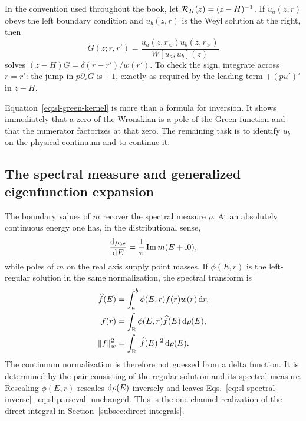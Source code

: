 In the convention used throughout the book, let
$\mathcal{R}_H(z)=(z-H)^{-1}$.  If $u_a(z,r)$ obeys the left
boundary condition and $u_b(z,r)$ is the Weyl solution at the right, then
\begin{equation}
  G(z;r,r')
  =\frac{u_a(z,r_<)u_b(z,r_>)}
  {W[u_a,u_b](z)}
  \label{eq:sl-green-kernel}
\end{equation}
solves $(z-H)G=\delta(r-r')/w(r')$.  To check the sign, integrate across
$r=r'$: the jump in $p\partial_rG$ is $+1$, exactly as required by the
leading term $+(pu')'$ in $z-H$.

Equation~\eqref{eq:sl-green-kernel} is more than a formula for inversion.  It
shows immediately that a zero of the Wronskian is a pole of the Green
function and that the numerator factorizes at that zero.  The remaining task
is to identify $u_b$ on the physical continuum and to continue it.

\subsection{The spectral measure and generalized eigenfunction expansion}
\label{subsec:sl-eigenfunction-expansion}

The boundary values of $m$ recover the spectral measure $\rho$.  At an
absolutely continuous energy one has, in the distributional sense,
\begin{equation}
  \frac{\mathrm{d}\rho_{\mathrm{ac}}}{\mathrm{d} E}
  =\frac{1}{\pi}\operatorname{Im} m(E+\mathrm{i}0),
  \label{eq:m-spectral-density}
\end{equation}
while poles of $m$ on the real axis supply point masses.  If $\phi(E,r)$ is
the left-regular solution in the same normalization, the spectral transform
is
\begin{align}
  \widehat f(E)
  &=\int_a^b\phi(E,r)f(r)w(r)\,\mathrm{d} r,
  \label{eq:sl-spectral-transform}\\
  f(r)
  &=\int_{\mathbb{R}}\phi(E,r)\widehat f(E)\,\mathrm{d}\rho(E),
  \label{eq:sl-spectral-inverse}\\
  \|f\|_w^2
  &=\int_{\mathbb{R}}|\widehat f(E)|^2\,\mathrm{d}\rho(E).
  \label{eq:sl-parseval}
\end{align}
The continuum normalization is therefore not guessed from a delta function.
It is determined by the pair consisting of the regular solution and its
spectral measure.  Rescaling $\phi(E,r)$ rescales $\mathrm{d}\rho(E)$ inversely and
leaves Eqs.~\eqref{eq:sl-spectral-inverse}--\eqref{eq:sl-parseval}
unchanged.  This is the one-channel realization of the direct integral in
Section~\ref{subsec:direct-integrals}.

